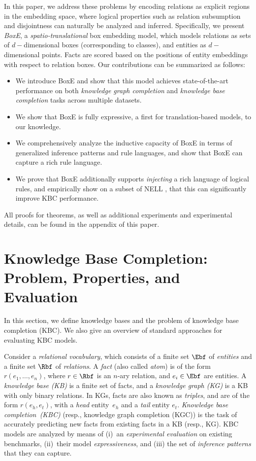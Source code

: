 \documentclass{article}
\begin{document}
In this paper, we address these problems by encoding relations as explicit regions in the embedding space, where logical properties such as relation subsumption and disjointness can naturally be analyzed and inferred. Specifically, we present \emph{BoxE}, a \emph{spatio-translational} box embedding model, which models relations as sets of $d-$dimensional boxes (corresponding to classes), and entities as $d-$dimensional points. 
Facts are scored based on the positions of entity embeddings with respect to relation boxes. Our contributions can be summarized as follows:
\begin{itemize}[--,leftmargin=8pt]
	\item We introduce BoxE and show that this model achieves state-of-the-art performance on both \emph{knowledge graph completion} and \emph{knowledge base completion} tasks across multiple datasets.
	
	\item We show that BoxE is fully expressive, a first for translation-based models, to our knowledge. 

	\item We comprehensively analyze the inductive capacity of BoxE in terms of generalized inference patterns and rule languages, and show that BoxE can capture a rich rule language.

	\item We prove that BoxE additionally supports \emph{injecting} a rich language of logical rules, and empirically show on a subset of NELL \cite{MitchellBCM18}, that this can significantly improve KBC performance.
\end{itemize}

All proofs for theorems, as well as additional experiments and experimental details, can be found in the appendix of this paper. 


\section{Knowledge Base Completion: Problem, Properties, and Evaluation}
In this section, we define knowledge bases and the problem of knowledge base completion (KBC). We also give an overview of standard approaches for evaluating KBC models.

Consider a \emph{relational vocabulary}, which consists of a finite set $\Ebf$ of \emph{entities} and a finite set $\Rbf$ of \emph{relations}. A \emph{fact} (also called \emph{atom}) is of the form $r(e_1, \ldots, e_n)$, where $r \in \Rbf$ is an $n$-ary relation, and $e_i \in \Ebf$ are entities. 
A \emph{knowledge base (KB)} is a finite set of facts, and a \emph{knowledge graph (KG)} is a KB with only binary relations. In KGs, facts are also known as \emph{triples}, and are of the form $r(e_h,e_t)$,  with a \emph{head} entity~$e_h$ and a \emph{tail} entity $e_t$. \emph{Knowledge base completion~(KBC)} (resp., knowledge graph completion (KGC)) is the task of accurately predicting new facts from existing facts in a KB (resp., KG). KBC models are analyzed by means of (i)~an \emph{experimental evaluation} on existing benchmarks, (ii)~their model \emph{expressiveness}, and (iii) the set of \emph{inference patterns} that they can capture.
\end{document}
